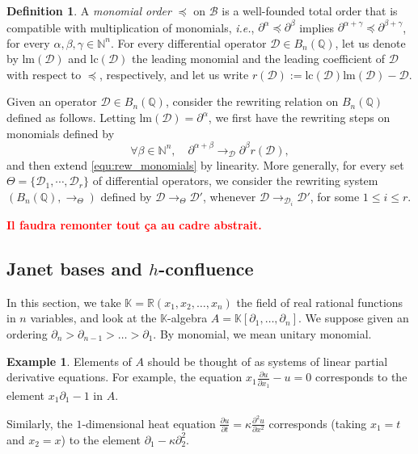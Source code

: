 \documentclass[10pt]{easychair}
\theoremstyle{definition}
\newtheorem{definition}[theorem]{Definition}
\newtheorem{example}[theorem]{Example}
\newcommand\ie{\emph{i.e.}}
\newcommand\todo[1]{{\bf\textcolor{red}{#1.}}}
\newcommand\D{\mathcal{D}}
\newcommand\lm{\text{lm}}
\newcommand\lc{\text{lc}}
\newcommand\basis{\mathscr{B}}
\newcommand\K{\mathbb{K}}
\newcommand\Q{\mathbb{Q}}
\newcommand\N{\mathbb{N}}
\newcommand\Weyl{B_n(\Q)}
\newcommand\rewTheta{\to_{\Theta}}
\begin{document}
\begin{definition}
  A {\em monomial order} $\preceq$ on $\basis$ is a well-founded total
  order that is compatible with multiplication of monomials, \ie,
  $\partial^{\alpha}\preceq\partial^{\beta}$ implies 
  $\partial^{\alpha+\gamma}\preceq\partial^{\beta+\gamma}$, for every
  $\alpha,\beta,\gamma\in\N^n$. For every differential operator
  $\D\in\Weyl$, let us denote by $\lm(\D)$ and $\lc(\D)$ the leading
  monomial and the leading coefficient of $\D$ with respect to $\preceq$,
  respectively, and let us write $r(\D):=\lc(\D)\lm(\D)-\D$. 
\end{definition}

Given an operator $\D\in\Weyl$, consider the rewriting relation on
$\Weyl$ defined as follows. Letting $\lm(\D)=\partial^{\alpha}$, we first
have the rewriting steps on monomials defined by
\begin{equation}\label{equ:rew_monomials}
  \forall\beta\in\N^n,\quad\partial^{\alpha+\beta}
  \to_{\D}\partial^{\beta}r(\D),\end{equation}
and then extend \eqref{equ:rew_monomials} by linearity. More generally,
for every set $\Theta=\{\D_1,\cdots,\D_r\}$ of differential operators, we
consider the rewriting system $(\Weyl,\rewTheta)$ defined by
$\D\rewTheta\D'$, whenever $\D\to_{\D_i}\D'$, for some $1\leq i\leq r$.

\todo{Il faudra remonter tout ça au cadre abstrait}

\subsection{Janet bases and $h$-confluence}
\label{sec:Janet_bases_and_h_confluence}

In this section, we take $\K = \mathbb R(x_1,x_2,\ldots,x_n)$ the field of real rational functions in $n$ variables, and look at the $\K$-algebra $A = \K[\partial_1,\ldots,\partial_n]$. We suppose given an ordering $\partial_n > \partial_{n-1} > \ldots > \partial_1$. By monomial, we mean unitary monomial.

\begin{example}
  Elements of $A$ should be thought of as systems of linear partial derivative equations. For example, the equation $x_1 \frac{\partial u}{\partial x_1} - u = 0$ corresponds to the element $x_1 \partial_1 - 1$ in $A$.

  Similarly, the $1$-dimensional heat equation $\frac{\partial u}{\partial t} = \kappa \frac{\partial^2 u}{\partial x^2}$  corresponds (taking $x_1 = t$ and $x_2 = x$) to the element $\partial_1 - \kappa \partial_2^2$.
\end{example}
\end{document}
